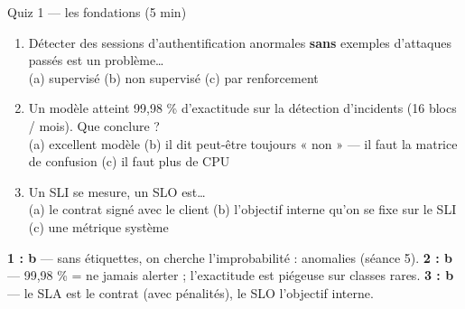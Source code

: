 \begin{frame}{Quiz 1 --- les fondations (5 min)}
\begin{qbox}
\begin{enumerate}
\item Détecter des sessions d'authentification anormales \textbf{sans} exemples
d'attaques passés est un problème\ldots\\
(a) supervisé \quad (b) non supervisé \quad (c) par renforcement
\item Un modèle atteint 99,98 \% d'exactitude sur la détection d'incidents
(16 blocs / mois). Que conclure ?\\
(a) excellent modèle \quad (b) il dit peut-être toujours « non » --- il faut
la matrice de confusion \quad (c) il faut plus de CPU
\item Un SLI se mesure, un SLO est\ldots\\
(a) le contrat signé avec le client \quad (b) l'objectif interne qu'on se fixe
sur le SLI \quad (c) une métrique système
\end{enumerate}
\end{qbox}
\vspace{1mm}
\begin{solbox}[Réponses]
\textbf{1 : b} --- sans étiquettes, on cherche l'improbabilité : anomalies (séance 5).
\quad
\textbf{2 : b} --- 99,98 \% = ne jamais alerter ; l'exactitude est piégeuse sur classes rares.
\quad
\textbf{3 : b} --- le SLA est le contrat (avec pénalités), le SLO l'objectif interne.
\end{solbox}
\end{frame}
